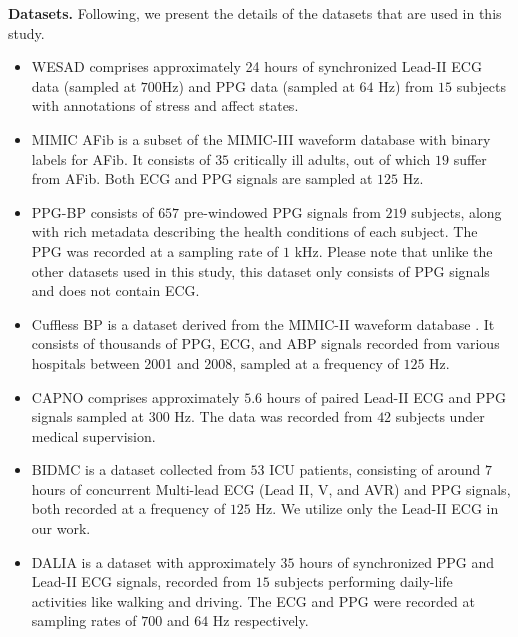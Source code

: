 \documentclass[letterpaper]{article} %
\begin{document}
\noindent\textbf{Datasets.} Following, we present the details of the datasets that are used in this study.

\begin{itemize}
    \item WESAD \citep{schmidt2018introducing} comprises approximately 24 hours of synchronized Lead-II ECG data (sampled at $700$Hz) and PPG data (sampled at $64$ Hz) from $15$ subjects with annotations of stress and affect states. %

    \item MIMIC AFib \cite{bashar2019noise} is a subset of the MIMIC-III waveform database \cite{johnson2016mimic} with binary labels for AFib. It consists of $35$ critically ill adults, out of which $19$ suffer from AFib. Both ECG and PPG signals are sampled at $125$ Hz.

    \item PPG-BP \cite{liang2018new} consists of $657$ pre-windowed PPG signals from $219$ subjects, along with rich metadata describing the health conditions of each subject. The PPG was recorded at a sampling rate of $1$ kHz. Please note that unlike the other datasets used in this study, this dataset only consists of PPG signals and does not contain ECG.  %

    \item Cuffless BP \cite{kachuee2015cuff} is a dataset derived from the MIMIC-II waveform database \cite{saeed2011multiparameter}. It consists of thousands of PPG, ECG, and ABP signals recorded from various hospitals between 2001 and 2008, sampled at a frequency of $125$ Hz. %

    \item CAPNO \citep{karlen2021capnobase} comprises approximately $5.6$ hours of paired Lead-II ECG and PPG signals sampled at $300$ Hz. The data was recorded from $42$ subjects under medical supervision.

    \item BIDMC \citep{pimentel2016toward} is a dataset collected from $53$ ICU patients, consisting of around $7$ hours of concurrent Multi-lead ECG (Lead II, V, and AVR) and PPG signals, both recorded at a frequency of $125$ Hz. We utilize only the Lead-II ECG in our work.

    \item DALIA \citep{reiss2019deep} is a dataset with approximately $35$ hours of synchronized PPG and Lead-II ECG signals, recorded from $15$ subjects performing daily-life activities like walking and driving. The ECG and PPG were recorded at sampling rates of $700$ and $64$ Hz respectively. %

\end{itemize}
\end{document}
